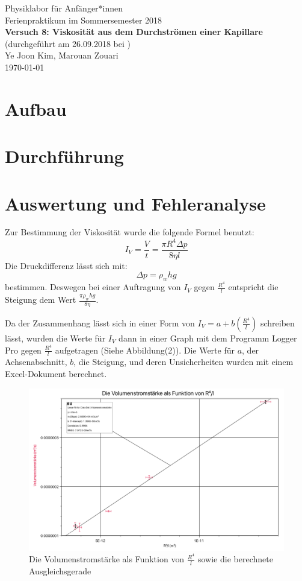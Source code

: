 \documentclass[11pt,a4paper]{article}
\begin{document}
	

{
	\centering 
	\large 
	Physiklabor für Anfänger*innen \\
	Ferienpraktikum im Sommersemester 2018 \\[4mm]
	\textbf{\LARGE 
		Versuch 8: Viskosität aus dem Durchströmen einer Kapillare
	} \\[3mm]
	(durchgeführt am 26.09.2018 bei ) \\
	Ye Joon Kim, Marouan Zouari\\
	\today \\[10mm]
}
\tableofcontents

\section{Aufbau}


\section{Durchführung}

\section{Auswertung und Fehleranalyse}
Zur Bestimmung der Viskosität wurde die folgende Formel benutzt:
\begin{equation}
	I_V = \frac{V}{t} = \frac{\pi R^4 \Delta p}{8 \eta l}
\end{equation}
Die Druckdifferenz lässt sich mit:
$$\Delta p = \rho_w hg$$
bestimmen. Deswegen bei einer Auftragung von $I_V$ gegen $\frac{R^4}{l}$ entspricht die Steigung dem Wert $\frac{ \pi \rho_w hg}{8\eta}$.

Da der Zusammenhang lässt sich in einer Form von $I_V = a + b(\frac{R^4}{l})$ schreiben lässt, wurden die Werte für $I_V$ dann in einer Graph mit dem Programm Logger Pro gegen $\frac{R^4}{l}$ aufgetragen (Siehe Abbildung(2)). Die Werte für $a$, der Achsenabschnitt, $b$, die Steigung, und deren Unsicherheiten wurden mit einem Excel-Dokument berechnet. 

\begin{figure}
	\centering
	\includegraphics[width=\linewidth]{Abb2}
	\caption{Die Volumenstromstärke als Funktion von $\frac{R^4}{l}$ sowie die berechnete Ausgleichsgerade}
\end{figure}
\end{document}
